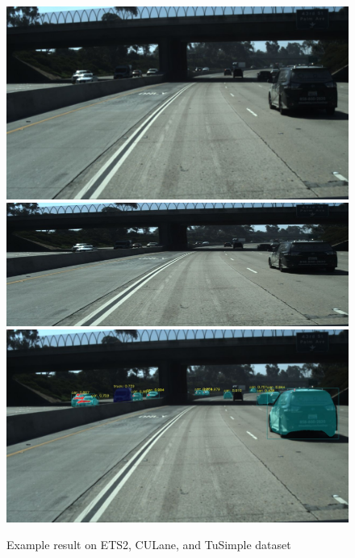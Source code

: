 \documentclass[runningheads]{llncs}
\begin{document}
\begin{figure}[!htb]
	\includegraphics[width=\linewidth]{result/22.jpg}
	\endminipage\hfill
	\includegraphics[width=\linewidth]{result/22-lane.jpg}
	\endminipage\hfill
	\includegraphics[width=\linewidth]{result/22-obj.jpg}
	\endminipage
\caption{Example result on ETS2, CULane, and TuSimple dataset}
\end{figure}
\clearpage




\end{document}
